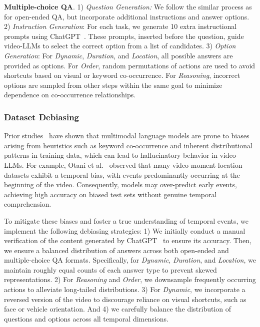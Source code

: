\noindent\textbf{Multiple-choice QA}. 1) \textit{Question Generation:} We follow the similar process as for open-ended QA, but incorporate additional instructions and answer options. 2) \textit{Instruction Generation}: For each task, we generate 10 extra instructional prompts using ChatGPT~\cite{OpenAI2024GPT-4}. These prompts, inserted before the question, guide video-LLMs to select the correct option from a list of candidates.
 3) \textit{Option Generation}: 
For \textit{Dynamic}, \textit{Duration}, and \textit{Location}, all possible answers are provided as options. For \textit{Order}, random permutations of actions are used to avoid shortcuts based on visual or keyword co-occurrence.
For \textit{Reasoning}, incorrect options are sampled from other steps within the same goal to minimize dependence on co-occurrence relationships. 


\subsubsection{Dataset Debiasing}

Prior studies~\cite{Tong2024Eyes,Yu2024HalluciDoctor,Zhang2022Incorporating,Huang2024OPERA} have shown that multimodal language models are prone to biases arising from heuristics such as keyword co-occurrence and inherent distributional patterns in training data, which can lead to hallucinatory behavior in video-LLMs. For example, Otani et al.~\cite{Otani2020Uncovering} observed that many video moment location datasets exhibit a temporal bias, with events predominantly occurring at the beginning of the video. Consequently, models may over-predict early events, achieving high accuracy on biased test sets without genuine temporal comprehension. 


To mitigate these biases and foster a true understanding of temporal events, we implement the following debiasing strategies: 1) We initially conduct a manual verification of the content generated by ChatGPT~\cite{OpenAI2024GPT-4} to ensure its accuracy. Then, we ensure a balanced distribution of answers across both open-ended and multiple-choice QA formats. Specifically, for \textit{Dynamic}, \textit{Duration}, and \textit{Location}, we maintain roughly equal counts of each answer type to prevent skewed representations. 2) For \textit{Reasoning} and \textit{Order}, we downsample frequently occurring actions to alleviate long-tailed distributions. 3) For \textit{Dynamic}, we incorporate a reversed version of the video to discourage reliance on visual shortcuts, such as face or vehicle orientation. And 4) we carefully balance the distribution of questions and options across all temporal dimensions. 


